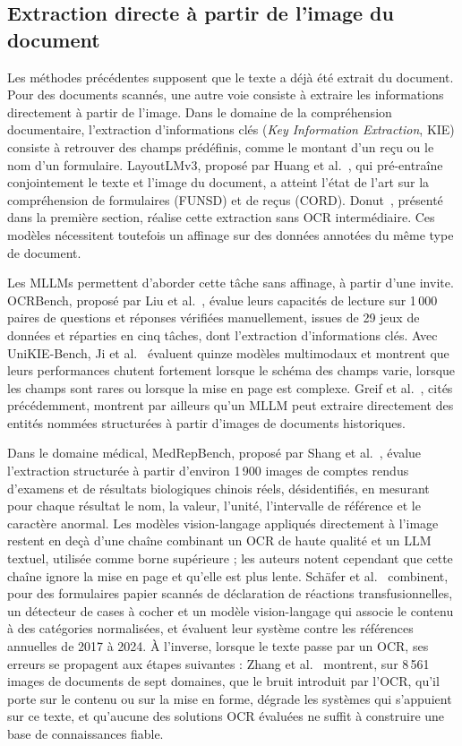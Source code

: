 \subsection{Extraction directe à partir de l'image du document}

Les méthodes précédentes supposent que le texte a déjà été extrait du document. Pour des documents scannés, une autre voie consiste à extraire les informations directement à partir de l'image. Dans le domaine de la compréhension documentaire, l'extraction d'informations clés (\textit{Key Information Extraction}, KIE) consiste à retrouver des champs prédéfinis, comme le montant d'un reçu ou le nom d'un formulaire. LayoutLMv3, proposé par Huang et al.~\cite{huang2022layoutlmv3}, qui pré-entraîne conjointement le texte et l'image du document, a atteint l'état de l'art sur la compréhension de formulaires (FUNSD) et de reçus (CORD). Donut~\cite{kim2022donut}, présenté dans la première section, réalise cette extraction sans OCR intermédiaire. Ces modèles nécessitent toutefois un affinage sur des données annotées du même type de document.

Les MLLMs permettent d'aborder cette tâche sans affinage, à partir d'une invite. OCRBench, proposé par Liu et al.~\cite{liu2024ocrbench}, évalue leurs capacités de lecture sur 1\,000 paires de questions et réponses vérifiées manuellement, issues de 29 jeux de données et réparties en cinq tâches, dont l'extraction d'informations clés. Avec UniKIE-Bench, Ji et al.~\cite{ji2026unikie} évaluent quinze modèles multimodaux et montrent que leurs performances chutent fortement lorsque le schéma des champs varie, lorsque les champs sont rares ou lorsque la mise en page est complexe. Greif et al.~\cite{greif2025multimodal}, cités précédemment, montrent par ailleurs qu'un MLLM peut extraire directement des entités nommées structurées à partir d'images de documents historiques.

Dans le domaine médical, MedRepBench, proposé par Shang et al.~\cite{shang2025medrepbench}, évalue l'extraction structurée à partir d'environ 1\,900 images de comptes rendus d'examens et de résultats biologiques chinois réels, désidentifiés, en mesurant pour chaque résultat le nom, la valeur, l'unité, l'intervalle de référence et le caractère anormal. Les modèles vision-langage appliqués directement à l'image restent en deçà d'une chaîne combinant un OCR de haute qualité et un LLM textuel, utilisée comme borne supérieure ; les auteurs notent cependant que cette chaîne ignore la mise en page et qu'elle est plus lente. Schäfer et al.~\cite{schaefer2025transfusion} combinent, pour des formulaires papier scannés de déclaration de réactions transfusionnelles, un détecteur de cases à cocher et un modèle vision-langage qui associe le contenu à des catégories normalisées, et évaluent leur système contre les références annuelles de 2017 à 2024. À l'inverse, lorsque le texte passe par un OCR, ses erreurs se propagent aux étapes suivantes : Zhang et al.~\cite{zhang2025ocrhindersrag} montrent, sur 8\,561 images de documents de sept domaines, que le bruit introduit par l'OCR, qu'il porte sur le contenu ou sur la mise en forme, dégrade les systèmes qui s'appuient sur ce texte, et qu'aucune des solutions OCR évaluées ne suffit à construire une base de connaissances fiable.

